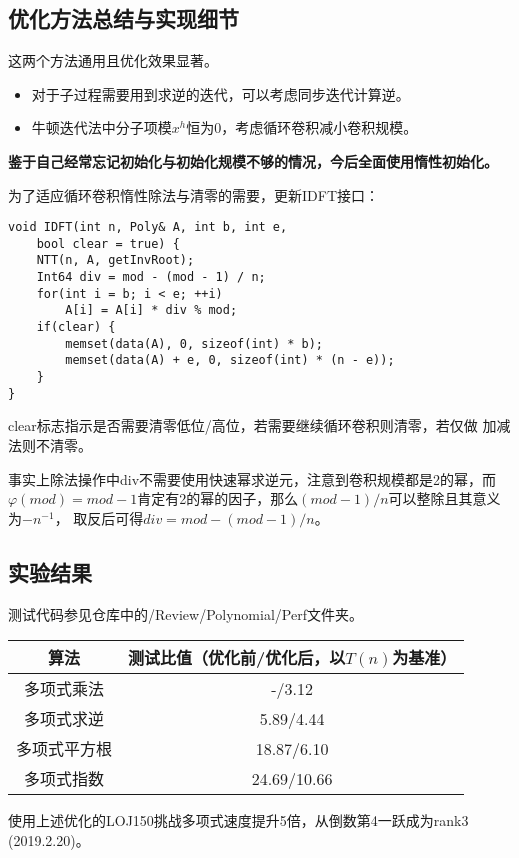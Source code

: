 \subsection{优化方法总结与实现细节}
这两个方法通用且优化效果显著。
\begin{itemize}
    \item 对于子过程需要用到求逆的迭代，可以考虑同步迭代计算逆。
    \item 牛顿迭代法中分子项模$x^h$恒为0，考虑循环卷积减小卷积规模。
\end{itemize}

{\bfseries 鉴于自己经常忘记初始化与初始化规模不够的情况，今后全面使用惰性初始化。}

为了适应循环卷积惰性除法与清零的需要，更新IDFT接口：
\begin{lstlisting}
void IDFT(int n, Poly& A, int b, int e,
    bool clear = true) {
    NTT(n, A, getInvRoot);
    Int64 div = mod - (mod - 1) / n;
    for(int i = b; i < e; ++i)
        A[i] = A[i] * div % mod;
    if(clear) {
        memset(data(A), 0, sizeof(int) * b);
        memset(data(A) + e, 0, sizeof(int) * (n - e));
    }
}
\end{lstlisting}

clear标志指示是否需要清零低位/高位，若需要继续循环卷积则清零，若仅做
加减法则不清零。

事实上除法操作中div不需要使用快速幂求逆元，注意到卷积规模都是2的幂，而
$\varphi(mod)=mod-1$肯定有2的幂的因子，那么$(mod-1)/n$可以整除且其意义为$-n^{-1}$，
取反后可得$div=mod-(mod-1)/n$。
\subsection{实验结果}
测试代码参见仓库中的/Review/Polynomial/Perf文件夹。

\begin{tabular}{c|c}
\hline
算法 & 测试比值（优化前/优化后，以$T(n)$为基准）\\
\hline
多项式乘法 & -/3.12\\
多项式求逆&5.89/4.44\\
多项式平方根&18.87/6.10\\
多项式指数&24.69/10.66\\
\hline
\end{tabular}

使用上述优化的LOJ150挑战多项式速度提升5倍，从倒数第4一跃成为rank3\\(2019.2.20)。
